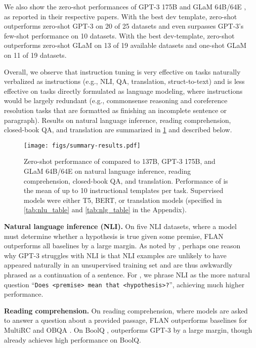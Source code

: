 We also show the zero-shot performances of GPT-3 175B \citep{brown2020language} and GLaM 64B/64E \citep{du2021glam}, as reported in their respective papers. 
With the best dev template, zero-shot \flan{} outperforms zero-shot GPT-3 on 20 of 25 datasets and even surpasses GPT-3's few-shot performance on 10 datasets. 
With the best dev-template, zero-shot \flan{} outperforms zero-shot GLaM on 13 of 19 available datasets and one-shot GLaM on 11 of 19 datasets.

Overall, we observe that instruction tuning is very effective on tasks naturally verbalized as instructions (e.g., NLI, QA, translation, struct-to-text) and is less effective on tasks directly formulated as language modeling, where instructions would be largely redundant (e.g., commonsense reasoning and coreference resolution tasks that are formatted as finishing an incomplete sentence or paragraph).
Results on natural language inference, reading comprehension, closed-book QA, and translation are summarized in \cref{fig:flan-results-summary} and described below.

\begin{figure}[h]
    \centering
    \texttt{[image: figs/summary-results.pdf]}
    \vspace{-6mm}
    \caption{Zero-shot performance of \flan{} compared to \baselm{} 137B, GPT-3 175B, and GLaM 64B/64E on natural language inference, reading comprehension, closed-book QA, and translation. 
    Performance of \flan{} is the mean of up to 10 instructional templates per task.
    Supervised models were either T5, BERT, or translation models (specified in \cref{tab:nlu_table} and \cref{tab:nlg_table} in the Appendix).
    }
    \vspace{-1mm}
    \label{fig:flan-results-summary}
\end{figure}

\textbf{Natural language inference (NLI).} 
On five NLI datasets, where a model must determine whether a hypothesis is true given some premise, FLAN outperforms all baselines by a large margin. %
As noted by \citet{brown2020language}, perhaps one reason why GPT-3 struggles with NLI is that NLI examples are unlikely to have appeared naturally in an unsupervised training set and are thus awkwardly phrased as a continuation of a sentence. 
For \flan{}, we phrase NLI as the more natural question ``\texttt{\small Does <premise> mean that <hypothesis>?}'', achieving much higher performance.

\textbf{Reading comprehension.} 
On reading comprehension, where models are asked to answer a question about a provided passage, FLAN outperforms baselines for MultiRC \citep{khashabi-etal-2018-looking} and OBQA \citep{mihaylov-etal-2018-suit}.
On BoolQ \citep{clark-etal-2019-boolq}, \flan{} outperforms GPT-3 by a large margin, though \baselm{} already achieves high performance on BoolQ.

